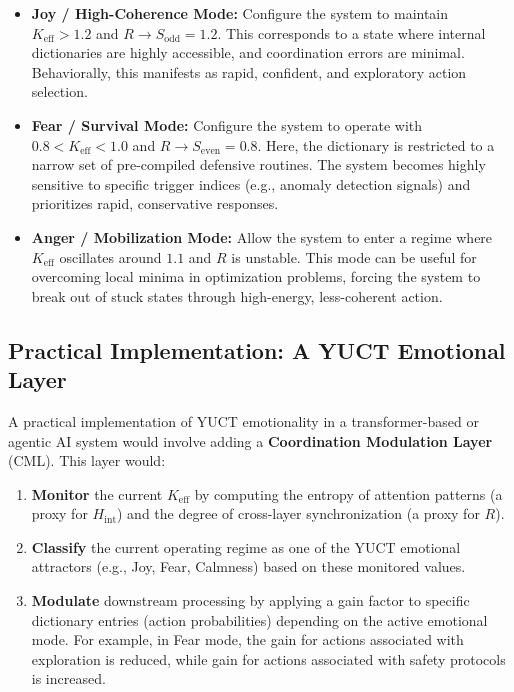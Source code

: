 \documentclass[12pt,a4paper]{article}
\begin{document}
	\begin{itemize}
		\item \textbf{Joy / High-Coherence Mode:} Configure the system to maintain \(K_{\mathrm{eff}} > 1.2\) and \(R \to S_{\mathrm{odd}} = 1.2\). This corresponds to a state where internal dictionaries are highly accessible, and coordination errors are minimal. Behaviorally, this manifests as rapid, confident, and exploratory action selection.
		\item \textbf{Fear / Survival Mode:} Configure the system to operate with \(0.8 < K_{\mathrm{eff}} < 1.0\) and \(R \to S_{\mathrm{even}} = 0.8\). Here, the dictionary is restricted to a narrow set of pre-compiled defensive routines. The system becomes highly sensitive to specific trigger indices (e.g., anomaly detection signals) and prioritizes rapid, conservative responses.
		\item \textbf{Anger / Mobilization Mode:} Allow the system to enter a regime where \(K_{\mathrm{eff}}\) oscillates around \(1.1\) and \(R\) is unstable. This mode can be useful for overcoming local minima in optimization problems, forcing the system to break out of stuck states through high-energy, less-coherent action.
	\end{itemize}
	
	\subsection{Practical Implementation: A YUCT Emotional Layer}
	
	A practical implementation of YUCT emotionality in a transformer-based or agentic AI system would involve adding a \textbf{Coordination Modulation Layer} (CML). This layer would:
	
	\begin{enumerate}
		\item \textbf{Monitor} the current \(K_{\mathrm{eff}}\) by computing the entropy of attention patterns (a proxy for \(H_{\mathrm{int}}\)) and the degree of cross-layer synchronization (a proxy for \(R\)).
		\item \textbf{Classify} the current operating regime as one of the YUCT emotional attractors (e.g., Joy, Fear, Calmness) based on these monitored values.
		\item \textbf{Modulate} downstream processing by applying a gain factor to specific dictionary entries (action probabilities) depending on the active emotional mode. For example, in Fear mode, the gain for actions associated with exploration is reduced, while gain for actions associated with safety protocols is increased.
	\end{enumerate}
	
\end{document}
